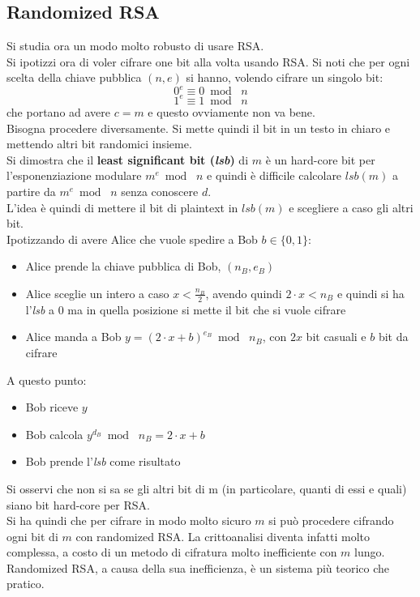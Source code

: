 \documentclass[a4paper,12pt, oneside]{book}
\begin{document}
\subsection{Randomized RSA}
Si studia ora un modo molto robusto di usare RSA.\\
Si ipotizzi ora di voler cifrare one bit alla volta usando RSA. Si noti che per
ogni scelta della chiave pubblica $(n,e)$ si hanno, volendo cifrare un singolo
bit: 
\[0^e\equiv 0\bmod\,\,n\]
\[1^e\equiv 1\bmod\,\,n\]
che portano ad avere $c=m$ e questo ovviamente non va bene.\\
Bisogna procedere diversamente. Si mette quindi il bit in un testo in chiaro e
mettendo altri bit randomici insieme.\\
Si dimostra che il \textbf{least significant bit (\textit{lsb})} di $m$
è un hard-core bit per l'esponenziazione modulare $m^e\bmod \,\,n$ e quindi è
difficile 
calcolare $lsb(m)$ a partire da  $m^e\bmod \,\,n$ senza conoscere $d$.\\
L'idea è quindi di mettere il bit di plaintext in $lsb(m)$ e scegliere a caso
gli altri bit.\\
Ipotizzando di avere Alice che vuole spedire a Bob $b\in\{0,1\}$:
\begin{itemize}
  \item Alice prende la chiave pubblica di Bob, $(n_B,e_B)$
  \item Alice sceglie un intero a caso $x<\frac{n_B}{2}$, avendo quindi $2\cdot
  x<n_B$ e quindi si ha l'\textit{lsb} a 0 ma in quella posizione si mette il
  bit che si vuole cifrare
  \item Alice manda a Bob $y=(2\cdot x+b)^{e_B}\bmod\,\,n_B$, con $2x$ bit
  casuali e $b$ bit da cifrare
\end{itemize}
A questo punto:
\begin{itemize}
  \item Bob riceve $y$
  \item Bob calcola $y^{d_B}\bmod\,\,n_B=2\cdot x+b$
  \item Bob prende l'\textit{lsb} come risultato
\end{itemize}
Si osservi che non si sa se gli altri bit di m (in particolare, quanti di essi e
quali) siano bit hard-core per RSA.\\
Si ha quindi che per cifrare in modo molto sicuro $m$ si può procedere cifrando
ogni bit di $m$ con randomized RSA. La crittoanalisi diventa infatti molto
complessa, a costo di un metodo di cifratura molto inefficiente con $m$ lungo.\\
Randomized RSA, a causa della sua inefficienza, è un sistema più teorico che
pratico. 
\end{document}

